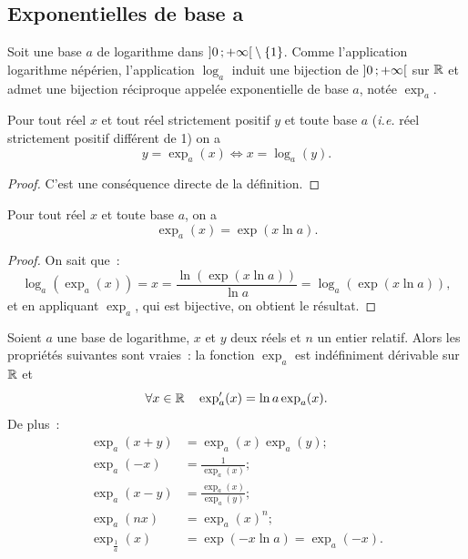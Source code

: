 \subsection{Exponentielles de base a}
\label{subsec:chap1-expa}
\begin{defdef}
    Soit une base \(a\) de logarithme dans \(\left] 0 \, ;  +\infty \right[\setminus\{1\}\). 
    Comme l'application logarithme népérien, l'application \(\log_a\) induit 
    une bijection de \(\left] 0 \, ;  +\infty \right[\) sur \(\mathbb{R}\) et admet une bijection 
    réciproque appelée exponentielle de base \(a\), notée \(\exp_a\).
\end{defdef}
\begin{prop}
    Pour tout réel \(x\) et tout réel strictement positif \(y\) et toute 
    base \(a\) (\emph{i.e.} réel strictement positif différent de 1) on a
    \begin{equation}
        y=\exp_a(x) \iff x=\log_a(y).
    \end{equation}
\end{prop}
\begin{proof}
    C'est une conséquence directe de la définition.
\end{proof}
\begin{prop}
    Pour tout réel \(x\) et toute base \(a\), on a
    \begin{equation}
        \exp_a(x)=\exp(x\ln a).
    \end{equation}
\end{prop}
\begin{proof}
    On sait que~:
    \begin{equation}
        \log_a(\exp_a(x))=x=\frac{\ln(\exp(x \ln a))}{\ln a}=\log_a(\exp(x 
        \ln a)),
    \end{equation}
    et en appliquant \(\exp_a\), qui est bijective, on obtient le résultat.
\end{proof}
\begin{prop}
    Soient \(a\) une base de logarithme, \(x\) et \(y\) deux réels et \(n\) 
    un entier relatif. Alors les propriétés suivantes sont vraies~: la 
    fonction \(\exp_a\) est indéfiniment dérivable sur \(\mathbb{R}\) et
    \begin{equation}
        \forall x \in \mathbb{R} \quad \exp_a'(x)=\ln a \exp_a(x).
    \end{equation}
    De plus~:
    \begin{align}
        \exp_a(x+y)&=\exp_a(x) \exp_a(y); \\
        \exp_a(-x)&=\frac{1}{\exp_a(x)}; \\
        \exp_a(x-y)&=\frac{\exp_a(x)}{\exp_a(y)}; \\
        \exp_a(nx)&=\exp_a(x)^n;\\
        \exp_{\frac{1}{a}}(x)&=\exp(-x \ln a)=\exp_a(-x).
    \end{align}
\end{prop}
